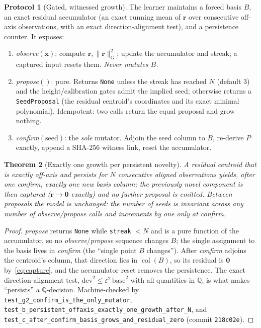 \documentclass[11pt]{article}
\theoremstyle{plain}
\newtheorem{theorem}{Theorem}[section]
\theoremstyle{definition}
\newtheorem{protocol}[theorem]{Protocol}
\theoremstyle{remark}
\newcommand{\Q}{\mathbb{Q}}
\newcommand{\rr}{\mathbf{r}}
\newcommand{\xx}{\mathbf{x}}
\newcommand{\GG}{G}
\newcommand{\BB}{B}
\DeclareMathOperator{\col}{col}
\begin{document}
\begin{protocol}[Gated, witnessed growth]\label{prot:growth}
The learner maintains a forced basis $\BB$, an exact residual accumulator (an exact running mean of $\rr$ over
consecutive off-axis observations, with an exact direction-alignment test), and a persistence counter. It
exposes:
\begin{enumerate}[label=(\alph*),leftmargin=*]
  \item \emph{observe}$(\xx)$: compute $\rr,\lVert\rr\rVert_\GG^2$; update the accumulator and streak; a
        captured input resets them. \emph{Never mutates $\BB$.}
  \item \emph{propose}$()$: pure. Returns \texttt{None} unless the streak has reached $N$ (default $3$) and the
        height/calibration gates admit the implied seed; otherwise returns a \texttt{SeedProposal} (the
        residual centroid's coordinates and its exact minimal polynomial). Idempotent: two calls return the
        equal proposal and grow nothing.
  \item \emph{confirm}$(\text{seed})$: the \emph{sole} mutator. Adjoin the seed column to $\BB$, re-derive $P$
        exactly, append a $\mathrm{SHA}\text{-}256$ witness link, reset the accumulator.
\end{enumerate}
\end{protocol}

\begin{theorem}[Exactly one growth per persistent novelty]\label{thm:onegrowth}
A residual centroid that is exactly off-axis and persists for $N$ consecutive aligned observations yields,
after one \emph{confirm}, exactly one new basis column; the previously novel component is then captured
($\rr\to\mathbf 0$ exactly) and no further proposal is emitted. Between proposals the model is unchanged: the
number of seeds is invariant across any number of \emph{observe}/\emph{propose} calls and increments by one
only at \emph{confirm}.
\end{theorem}
\begin{proof}
\emph{propose} returns \texttt{None} while \texttt{streak} $<N$ and is a pure function of the accumulator, so
no \emph{observe}/\emph{propose} sequence changes $\BB$; the single assignment to the basis lives in
\emph{confirm} (the ``single point $\BB$ changes''). After \emph{confirm} adjoins the centroid's column,
that direction lies in $\col(\BB)$, so its residual is $\mathbf 0$ by~\eqref{eq:capture}, and the accumulator
reset removes the persistence. The exact direction-alignment test, $\mathrm{dev}^2\le\varepsilon^2\,\mathrm{base}^2$
with all quantities in $\Q$, is what makes ``persists'' a $\Q$-decision. Machine-checked by
\texttt{test\_g2\_confirm\_is\_the\_only\_mutator}, \texttt{test\_b\_persistent\_offaxis\_exactly\_one\_growth\_after\_N},
and \texttt{test\_c\_after\_confirm\_basis\_grows\_and\_residual\_zero} (commit \texttt{218c02e}).
\end{proof}
\end{document}
